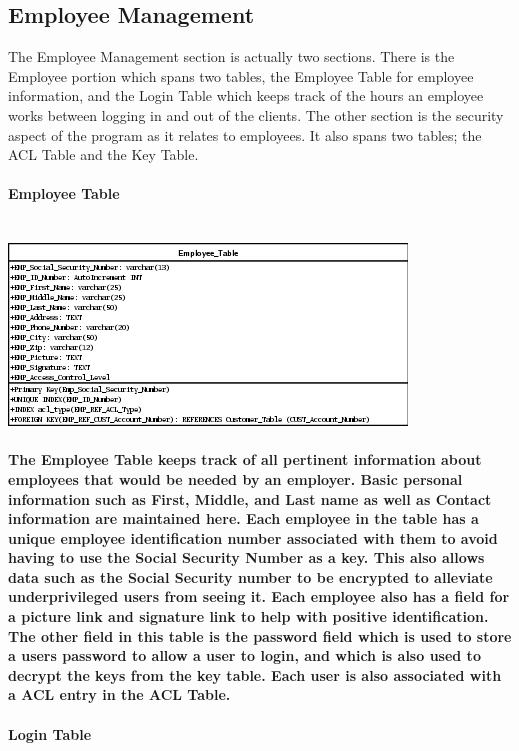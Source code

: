 \documentclass{report}
\begin{document}
	\subsection{Employee Management}

	The Employee Management section is actually two sections. There is the Employee portion which
	spans two tables, the Employee Table for employee information, and the Login Table which
	keeps track of the hours an employee works between logging in and out of the clients. The
	other section is the security aspect of the program as it relates to employees. It also spans
	two tables; the ACL Table and the Key Table.\\
	\\
	\bf{Employee Table}\\
	\\
	\\
	\includegraphics{Tables/EmployeeTable.png}
	\\
	\\
	The Employee Table keeps track of all pertinent information about employees that would
	be needed by an employer. Basic personal information such as First, Middle, and Last name
	as well as Contact information are maintained here. Each employee in the table has a unique
	employee identification number associated with them to avoid having to use the Social
	Security Number as a key. This also allows data such as the Social Security number to be
	encrypted to alleviate underprivileged users from seeing it. Each employee also has a
	field for a picture link and signature link to help with positive identification. The other
	field in this table is the password field which is used to store a users password to allow
	a user to login, and which is also used to decrypt the keys from the key table. Each user
	is also associated with a ACL entry in the ACL Table.\\
	\\
	\bf{Login Table}\\
	\\
	\\
\end{document}
